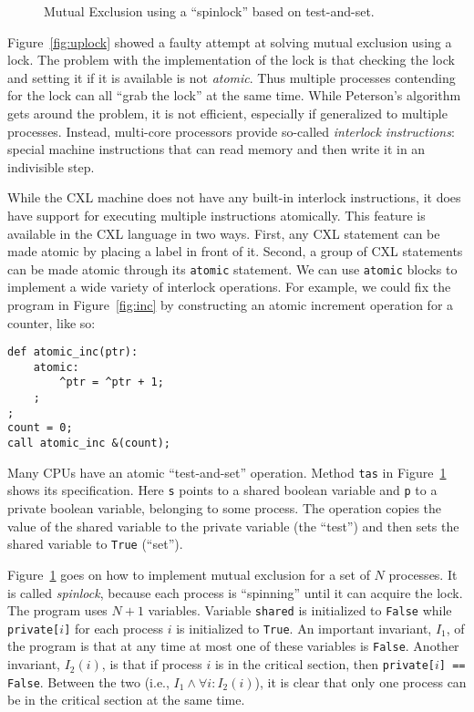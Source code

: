 \documentclass{report}
\newenvironment{code}{
\tcolorbox
}{
\endtcolorbox
}
\begin{document}
\begin{figure}
\begin{code}
\end{code}
\caption{Mutual Exclusion using a ``spinlock'' based on test-and-set.}
\label{fig:tas}
\end{figure}

Figure~\ref{fig:uplock} showed a faulty attempt at solving mutual
exclusion using a lock.  The problem with the implementation of the
lock is that checking the lock and setting it if it is available is
not \emph{atomic}.  Thus multiple processes contending for the lock
can all ``grab the lock'' at the same time.  While Peterson's
algorithm gets around the problem, it is not efficient, especially
if generalized to multiple processes.  Instead, multi-core processors provide
so-called \emph{interlock instructions}: special machine instructions
that can read memory and then write it in an indivisible step.

While the CXL machine does not have any built-in interlock instructions,
it does have support for executing multiple instructions atomically.
This feature is available in the CXL language in two ways.
First, any CXL statement can be made atomic by placing a label in front
of it.  Second, a group of CXL statements can be made atomic
through its \texttt{atomic}
statement.
We can use \texttt{atomic} blocks to implement a wide variety of
interlock operations.
For example, we could fix the program in Figure~\ref{fig:inc} by
constructing an atomic increment operation for a counter, like so:
\begin{code}
\begin{verbatim}
def atomic_inc(ptr):
    atomic:
        ^ptr = ^ptr + 1;
    ;
;
count = 0;
call atomic_inc &(count);
\end{verbatim}
\end{code}

Many CPUs have an atomic ``test-and-set'' operation.
Method \texttt{tas} in Figure~\ref{fig:tas} shows its specification.
Here \texttt{s} points to a shared boolean variable and \texttt{p}
to a private boolean variable, belonging to some process.
The operation copies the value of the shared variable to the
private variable (the ``test'')
and then sets the shared variable to \texttt{True} (``set'').

Figure~\ref{fig:tas} goes on how to implement mutual exclusion for
a set of $N$ processes.
It is called \emph{spinlock}, because each process is ``spinning'' until
it can acquire the lock.
The program uses $N+1$ variables.
Variable \texttt{shared} is initialized to \texttt{False} while
\texttt{private[$i$]} for each process $i$ is initialized to \texttt{True}.
An important invariant, $I_1$, of the program is that at any time at most
one of these variables is \texttt{False}.
Another invariant, $I_2(i)$, is that if process $i$ is in the critical section,
then \texttt{private[$i$] == False}.
Between the two (i.e., $I_1 \land \forall i: I_2(i)$),
it is clear that only one process can be in the
critical section at the same time.
\end{document}
